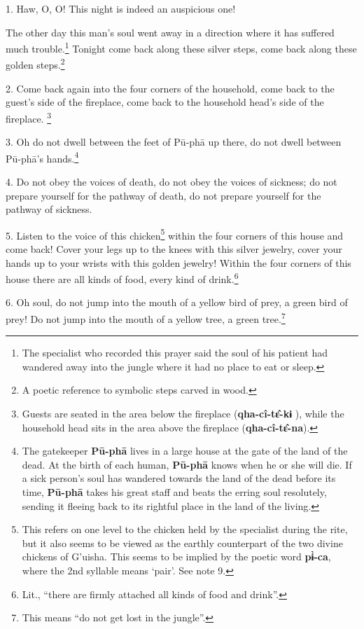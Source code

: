 \setcounter{footnote}{0}

1. Haw, O, O! This night is indeed an auspicious one!

The other day this man's soul went away in a direction where it has suffered much
trouble.\footnote{The specialist who recorded this prayer said the soul of his patient had wandered away into the jungle where it had no place to eat or sleep.} Tonight come back along these silver steps, come back along these
golden steps.\footnote{A poetic reference to symbolic steps carved in wood.}

2. Come back again into the four corners of the household, come back to the guest's
side of the fireplace, come back to the household head's side of the fireplace.
\footnote{Guests are seated in the area below the fireplace (\textbf{qha-cî-tɛ̂-kɨ} ), while the household head sits in the area above the fireplace (\textbf{qha-cî-tɛ̂-na}).}

3. Oh do not dwell between the feet of Pū-phā up there, do not dwell between
Pū-phā's hands.\footnote{The gatekeeper \textbf{Pū-phā} lives in a large house at the gate of the land of the dead. At the birth of each human, \textbf{Pū-phā} knows when he or she will die. If a sick person's soul has wandered towards the land of the dead before its time, \textbf{Pū-phā} takes his great staff and beats the erring soul resolutely, sending it fleeing back to its rightful place in the land of the living.}

4. Do not obey the voices of death, do not obey the voices of sickness; do not prepare
yourself for the pathway of death, do not prepare yourself for the pathway of sickness.

5. Listen to the voice of this chicken\footnote{This refers on one level to the chicken held by the specialist during the rite, but it also seems to be viewed as the earthly counterpart of the two divine chickens of G'uisha. This seems to be implied by the poetic word \textbf{pɨ̀-ca}, where the 2nd syllable means `pair'. See note 9.} within the four corners of this house
and come back! Cover your legs up to the knees with this silver jewelry, cover
your hands up to your wrists with this golden jewelry! Within the four corners
of this house there are all kinds of food, every kind of drink.\footnote{Lit., ``there are firmly attached all kinds of food and drink''.}

6. Oh soul, do not jump into the mouth of a yellow bird of prey, a green bird of
prey! Do not jump into the mouth of a yellow tree, a green tree.\footnote{This means ``do not get lost in the jungle''.}

